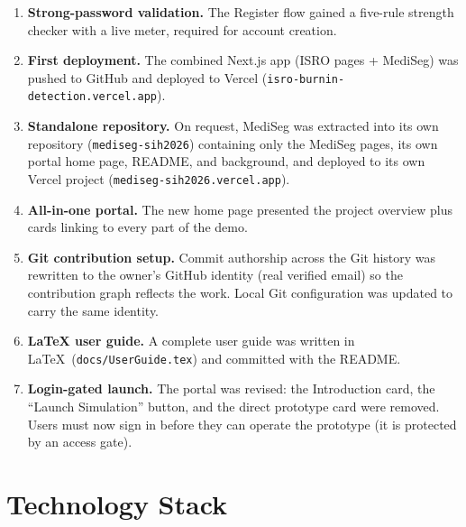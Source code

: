 \documentclass[11pt, a4paper]{article}
\begin{document}
\begin{enumerate}[leftmargin=1.6em, itemsep=4pt]
  \item \textbf{Strong-password validation.} The Register flow gained a
        five-rule strength checker with a live meter, required for account
        creation.

  \item \textbf{First deployment.} The combined Next.js app (ISRO pages +
        MediSeg) was pushed to GitHub and deployed to Vercel
        (\texttt{isro-burnin-detection.vercel.app}).

  \item \textbf{Standalone repository.} On request, MediSeg was extracted into
        its own repository (\texttt{mediseg-sih2026}) containing only the
        MediSeg pages, its own portal home page, README, and background, and
        deployed to its own Vercel project
        (\texttt{mediseg-sih2026.vercel.app}).

  \item \textbf{All-in-one portal.} The new home page presented the project
        overview plus cards linking to every part of the demo.

  \item \textbf{Git contribution setup.} Commit authorship across the Git
        history was rewritten to the owner's GitHub identity (real verified
        email) so the contribution graph reflects the work. Local Git
        configuration was updated to carry the same identity.

  \item \textbf{LaTeX user guide.} A complete user guide was written in
        \LaTeX~(\texttt{docs/UserGuide.tex}) and committed with the README.

  \item \textbf{Login-gated launch.} The portal was revised: the Introduction
        card, the ``Launch Simulation'' button, and the direct prototype card
        were removed. Users must now sign in before they can operate the
        prototype (it is protected by an access gate).
\end{enumerate}

\section{Technology Stack}
\end{document}
